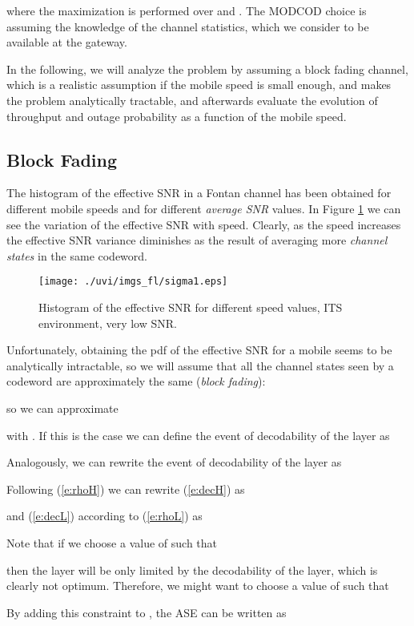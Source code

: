 \documentclass[journal,onecolumn,10pt,a4paper]{IEEEtran}
\begin{document}
where the maximization is performed over  and . The MODCOD choice is assuming the knowledge of the channel statistics, which we consider to be available at the gateway.

In the following, we will analyze the problem  by assuming a block fading channel, which is a realistic assumption if the mobile speed is small enough, and makes the problem analytically tractable, and afterwards evaluate the evolution of throughput and outage probability as a function of the mobile speed.

\subsection{Block Fading}
The histogram of the effective SNR in a Fontan channel has been obtained for different mobile speeds and for different \textit{average SNR} values. 
In Figure \ref{s1} we can see the variation of the effective SNR with speed. Clearly, as the speed increases the effective SNR variance diminishes as the result of averaging more \textit{channel states} in the same codeword.
\begin{figure}
\begin{center}
 \texttt{[image: ./uvi/imgs\_fl/sigma1.eps]}
\caption{Histogram of the effective SNR for different speed values, ITS environment, very low SNR. }
\label{s1}
\end{center}\end{figure}

Unfortunately, obtaining the pdf of the effective SNR for a mobile seems to be analytically intractable, so we will assume that all the channel states seen by a codeword are approximately the same ({\it block fading}): 

so we can approximate

with .
If this is the case we can define the event of decodability of the  layer as

Analogously, we can rewrite the event of decodability of the  layer as

Following (\ref{e:rhoH}) we can rewrite (\ref{e:decH}) as

and (\ref{e:decL}) according to (\ref{e:rhoL})  as

Note that if we choose a value of  such that 

then the  layer will be only limited by the decodability of the  layer, which is clearly not optimum. Therefore, we might want to choose a value of  such that

By adding this constraint to , the ASE can be written as
\end{document}
